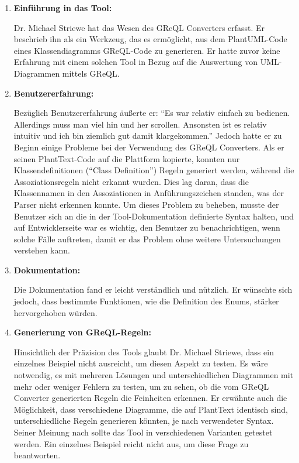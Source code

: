 \begin{enumerate}[itemsep=8pt, parsep=5pt]
    \item \textbf{Einführung in das Tool:}

    Dr. Michael Striewe hat das Wesen des GReQL Converters erfasst. Er beschrieb ihn als ein Werkzeug, das es
    ermöglicht, aus dem PlantUML-Code eines Klassendiagramms GReQL-Code zu generieren. Er hatte zuvor keine Erfahrung
    mit einem solchen Tool in Bezug auf die Auswertung von UML-Diagrammen mittels
    GReQL.

    \item \textbf{Benutzererfahrung:}

    Bezüglich Benutzererfahrung äußerte er: ``Es war relativ einfach zu bedienen. Allerdings muss man viel hin und her
    scrollen. Ansonsten ist es relativ intuitiv und ich bin ziemlich gut damit klargekommen.'' Jedoch hatte er zu Beginn
    einige Probleme bei der Verwendung des GReQL Converters. Als er seinen PlantText-Code auf die Plattform kopierte,
    konnten nur Klassendefinitionen (``Class Definition'') Regeln generiert werden, während die Assoziationsregeln nicht
    erkannt wurden. Dies lag daran, dass die Klassennamen in den Assoziationen in Anführungszeichen standen, was der
    Parser nicht erkennen konnte. Um dieses Problem zu beheben, musste der Benutzer sich an die in der Tool-Dokumentation
    definierte Syntax halten, und auf Entwicklerseite war es wichtig, den Benutzer zu benachrichtigen, wenn solche Fälle
    auftreten, damit er das Problem ohne weitere Untersuchungen verstehen kann.

    \item \textbf{Dokumentation:}

    Die Dokumentation fand er leicht verständlich und nützlich. Er wünschte sich jedoch, dass bestimmte Funktionen,
    wie die Definition des Enums, stärker hervorgehoben würden.

    \item \textbf{Generierung von GReQL-Regeln:}

    Hinsichtlich der Präzision des Tools glaubt Dr. Michael Striewe, dass ein einzelnes Beispiel nicht ausreicht, um
    diesen Aspekt zu testen. Es wäre notwendig, es mit mehreren Lösungen und unterschiedlichen Diagrammen mit mehr oder
    weniger Fehlern zu testen, um zu sehen, ob die vom GReQL Converter generierten Regeln die Feinheiten erkennen. Er
    erwähnte auch die Möglichkeit, dass verschiedene Diagramme, die auf PlantText identisch sind, unterschiedliche
    Regeln generieren könnten, je nach verwendeter Syntax. Seiner Meinung nach sollte das Tool in verschiedenen
    Varianten getestet werden. Ein einzelnes Beispiel reicht nicht aus, um diese Frage zu beantworten.



\end{enumerate}
